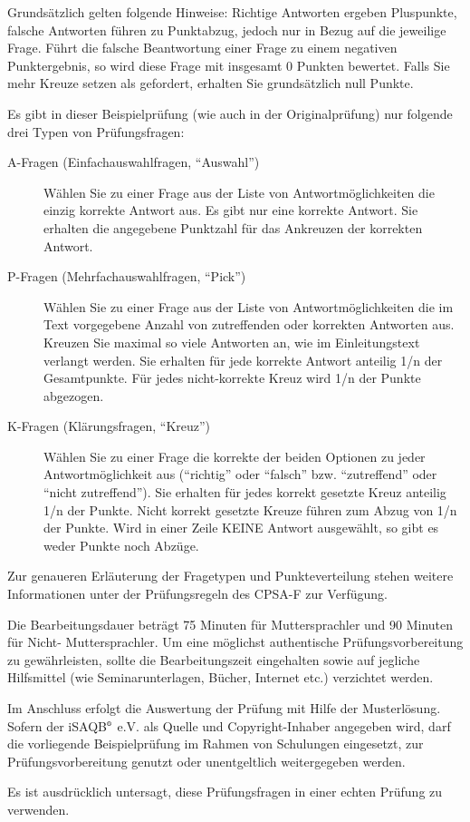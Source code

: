\documentclass[12pt,a4paper]{article}
\newcounter{examQuestion}\setcounter{examQuestion}{1}
\newcommand{\registered}{$^\textrm{\tiny\textregistered}$}
\begin{document}
Grundsätzlich gelten folgende Hinweise: Richtige Antworten ergeben
Pluspunkte, falsche Antworten führen zu Punktabzug, jedoch nur in
Bezug auf die jeweilige Frage. Führt die falsche Beantwortung einer
Frage zu einem negativen Punktergebnis, so wird diese Frage mit
insgesamt 0 Punkten bewertet.  Falls Sie mehr Kreuze setzen als
gefordert, erhalten Sie grundsätzlich null Punkte.

Es gibt in dieser Beispielprüfung (wie auch in der Originalprüfung)
nur folgende drei Typen von Prüfungsfragen:

\begin{description}
\item[A-Fragen (Einfachauswahlfragen, "`Auswahl"')] Wählen Sie zu
  einer Frage aus der Liste von Antwortmöglichkeiten die einzig
  korrekte Antwort aus. Es gibt nur eine korrekte Antwort. Sie
  erhalten die angegebene Punktzahl für das Ankreuzen der korrekten
  Antwort.
\item[P-Fragen (Mehrfachauswahlfragen, "`Pick"')] Wählen Sie zu einer
  Frage aus der Liste von Antwortmöglichkeiten die im Text vorgegebene
  Anzahl von zutreffenden oder korrekten Antworten aus. Kreuzen Sie
  maximal so viele Antworten an, wie im Einleitungstext verlangt
  werden. Sie erhalten für jede korrekte Antwort anteilig 1/n der
  Gesamtpunkte. Für jedes nicht-korrekte Kreuz wird 1/n der Punkte
  abgezogen.
\item[K-Fragen (Klärungsfragen, "`Kreuz"')] Wählen Sie zu einer Frage
  die korrekte der beiden Optionen zu jeder Antwortmöglichkeit aus
  ("`richtig"' oder "`falsch"' bzw. "`zutreffend"' oder "`nicht
  zutreffend"'). Sie erhalten für jedes korrekt gesetzte Kreuz anteilig
  1/n der Punkte. Nicht korrekt gesetzte Kreuze führen zum Abzug von
  1/n der Punkte. Wird in einer Zeile KEINE Antwort ausgewählt, so
  gibt es weder Punkte noch Abzüge.
\end{description}
%
Zur genaueren Erläuterung der Fragetypen und Punkteverteilung stehen
weitere Informationen unter der Prüfungsregeln des CPSA-F zur
Verfügung.

Die Bearbeitungsdauer beträgt 75 Minuten für Muttersprachler und 90
Minuten für Nicht- Muttersprachler. Um eine möglichst authentische
Prüfungsvorbereitung zu gewährleisten, sollte die Bearbeitungszeit
eingehalten sowie auf jegliche Hilfsmittel (wie Seminarunterlagen,
Bücher, Internet etc.) verzichtet werden.

Im Anschluss erfolgt die Auswertung der Prüfung mit Hilfe der
Musterlösung. Sofern der iSAQB\registered{} e.V. als Quelle und
Copyright-Inhaber angegeben wird, darf die vorliegende Beispielprüfung
im Rahmen von Schulungen eingesetzt, zur Prüfungsvorbereitung genutzt
oder unentgeltlich weitergegeben werden.

Es ist ausdrücklich untersagt, diese Prüfungsfragen in einer echten
Prüfung zu verwenden.

\newpage

\setcounter{examQuestion}{1}

\end{document}
